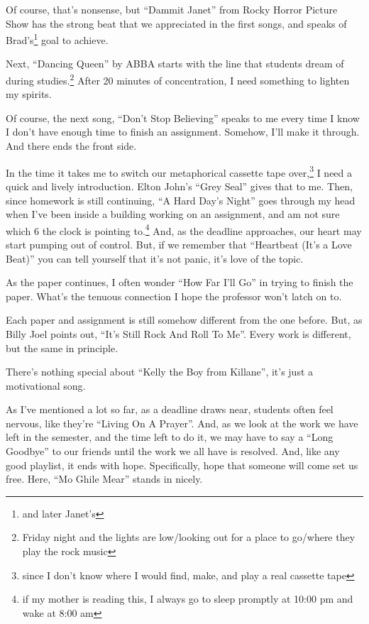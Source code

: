 \documentclass[12pt]{article}[titlepage]
\newcommand{\say}[1]{``#1''}
\newcommand{\1}{\={a}}
\newcommand{\2}{\={e}}
\newcommand{\3}{\={\i}}
\newcommand{\4}{\=o}
\newcommand{\5}{\=u}
\newcommand{\6}{\={A}}
\renewcommand{\,}{\textsuperscript{,}}
\begin{document}
Of course, that's nonsense, but \say{Dammit Janet} from Rocky Horror Picture Show has the strong beat that we appreciated in the first songs, and speaks of Brad's\footnote{and later Janet's} goal to achieve.

Next, \say{Dancing Queen} by ABBA starts with the line that students dream of during studies.\footnote{Friday night and the lights are low/looking out for a place to go/where they play the rock music}
After 20 minutes of concentration, I need something to lighten my spirits.

Of course, the next song, \say{Don't Stop Believing} speaks to me every time I know I don't have enough time to finish an assignment.
Somehow, I'll make it through.
And there ends the front side.

In the time it takes me to switch our metaphorical cassette tape over,\footnote{since I don't know where I would find, make, and play a real cassette tape} I need a quick and lively introduction.
Elton John's \say{Grey Seal} gives that to me.
Then, since homework is still continuing, \say{A Hard Day's Night} goes through my head when I've been inside a building working on an assignment, and am not sure which 6 the clock is pointing to.\footnote{if my mother is reading this, I always go to sleep promptly at 10:00 pm and wake at 8:00 am}
And, as the deadline approaches, our heart may start pumping out of control.
But, if we remember that \say{Heartbeat (It's a Love Beat)} you can tell yourself that it's not panic, it's love of the topic.

As the paper continues, I often wonder \say{How Far I'll Go} in trying to finish the paper.
What's the tenuous connection I hope the professor won't latch on to.

Each paper and assignment is still somehow different from the one before.
But, as Billy Joel points out, \say{It's Still Rock And Roll To Me}.
Every work is different, but the same in principle.

There's nothing special about \say{Kelly the Boy from Killane}, it's just a motivational song.

As I've mentioned a lot so far, as a deadline draws near, students often feel nervous, like they're \say{Living On A Prayer}.
And, as we look at the work we have left in the semester, and the time left to do it, we may have to say a \say{Long Goodbye} to our friends until the work we all have is resolved.
And, like any good playlist, it ends with hope.
Specifically, hope that someone will come set us free.
Here, \say{Mo Ghile Mear} stands in nicely.
\end{document}
